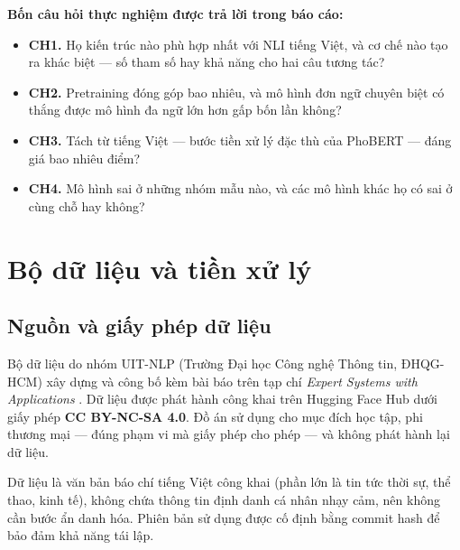 \documentclass[12pt,a4paper,oneside]{report}
\begin{document}
\noindent\textbf{Bốn câu hỏi thực nghiệm được trả lời trong báo cáo:}

\begin{itemize}[leftmargin=*,itemsep=3pt]
  \item \textbf{CH1.} Họ kiến trúc nào phù hợp nhất với NLI tiếng Việt, và cơ chế nào tạo
        ra khác biệt --- số tham số hay khả năng cho hai câu tương tác?
  \item \textbf{CH2.} Pretraining đóng góp bao nhiêu, và mô hình đơn ngữ chuyên biệt có
        thắng được mô hình đa ngữ lớn hơn gấp bốn lần không?
  \item \textbf{CH3.} Tách từ tiếng Việt --- bước tiền xử lý đặc thù của PhoBERT --- đáng
        giá bao nhiêu điểm?
  \item \textbf{CH4.} Mô hình sai ở những nhóm mẫu nào, và các mô hình khác họ có sai ở
        cùng chỗ hay không?
\end{itemize}

\chapter{Bộ dữ liệu và tiền xử lý}

\section{Nguồn và giấy phép dữ liệu}

Bộ dữ liệu do nhóm UIT-NLP (Trường Đại học Công nghệ Thông tin, ĐHQG-HCM) xây dựng và công
bố kèm bài báo trên tạp chí \textit{Expert Systems with Applications} \cite{vianli}. Dữ
liệu được phát hành công khai trên Hugging Face Hub dưới giấy phép
\textbf{CC BY-NC-SA 4.0}. Đồ án sử dụng cho mục đích học tập, phi thương mại --- đúng
phạm vi mà giấy phép cho phép --- và không phát hành lại dữ liệu.

Dữ liệu là văn bản báo chí tiếng Việt công khai (phần lớn là tin tức thời sự, thể thao,
kinh tế), không chứa thông tin định danh cá nhân nhạy cảm, nên không cần bước ẩn danh hóa.
Phiên bản sử dụng được cố định bằng commit hash để bảo đảm khả năng tái lập.
\end{document}
